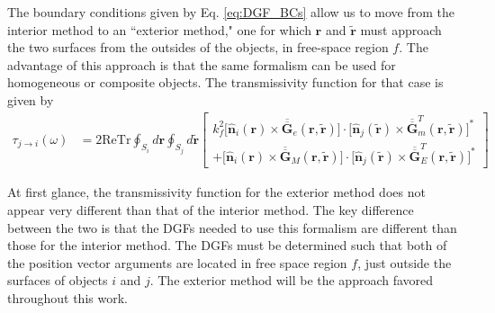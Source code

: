 The boundary conditions given by Eq. \ref{eq:DGF_BCs} allow us to move from the interior method to an ``exterior method," one for which $\boldsymbol{r}$ and $\widetilde{\boldsymbol{r}}$ must approach the two surfaces from the outsides of the objects, in free-space region $f$. The advantage of this approach is that the same formalism can be used for homogeneous or composite objects. The transmissivity function for that case is given by
%
\begin{align}
\tau_{j \rightarrow i} (\omega) &= 2 \mathrm{Re} \mathrm{Tr} \oint_{S_i} d\boldsymbol{r} \oint_{S_j} d\boldsymbol{\widetilde{r}}
\left[ \begin{array}{r} k_{f}^{2} \bigg[ \boldsymbol{\widehat{n}}_{i}(\boldsymbol{r}) \times \overline{\overline{\boldsymbol{G}}}_{e}(\boldsymbol{r}, \widetilde{\boldsymbol{r}}) \bigg] \cdot \bigg[ \boldsymbol{\widehat{n}}_{j}(\boldsymbol{\widetilde{r}}) \times \overline{\overline{\boldsymbol{G}}}_{m}^{T}(\boldsymbol{r}, \boldsymbol{\widetilde{r}}) \bigg]^{*} \\
+ \bigg[ \boldsymbol{\widehat{n}}_{i}(\boldsymbol{r}) \times \overline{\overline{\boldsymbol{G}}}_{M}(\boldsymbol{r}, \boldsymbol{\widetilde{r}}) \bigg] \cdot \bigg[ \boldsymbol{\widehat{n}}_{j}(\boldsymbol{\widetilde{r}}) \times \overline{\overline{\boldsymbol{G}}}_{E}^{T}(\boldsymbol{r}, \boldsymbol{\widetilde{r}}) \bigg]^{*}
\end{array} \right] \label{eq:Transmissivity_Exterior}
\end{align}

At first glance, the transmissivity function for the exterior method does not appear very different than that of the interior method. The key difference between the two is that the DGFs needed to use this formalism are different than those for the interior method. The DGFs must be determined such that both of the position vector arguments are located in free space region $f$, just outside the surfaces of objects $i$ and $j$. The exterior method will be the approach favored throughout this work.


